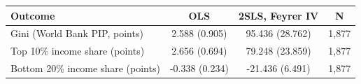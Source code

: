 \begin{tabular}{lccc}
\toprule
Outcome & OLS & 2SLS, Feyrer IV & N \\
\midrule
Gini (World Bank PIP, points) & 2.588\sym{***} (0.905) & 95.436\sym{***} (28.762) & 1,877 \\
Top 10\% income share (points) & 2.656\sym{***} (0.694) & 79.248\sym{***} (23.859) & 1,877 \\
Bottom 20\% income share (points) & -0.338 (0.234) & -21.436\sym{***} (6.491) & 1,877 \\
\bottomrule
\end{tabular}
